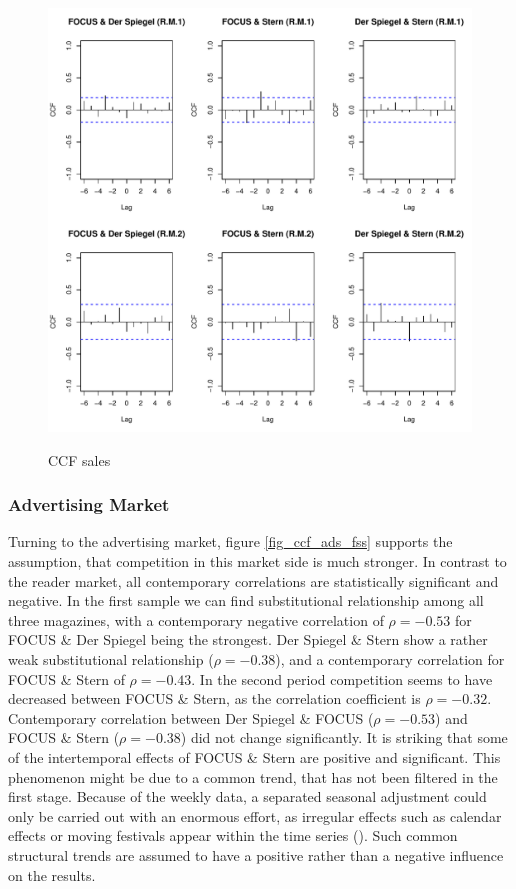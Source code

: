 \documentclass[12pt,a4paper,notitlepage]{article}
\begin{document}
\begin{figure}[H]
\caption{CCF sales}
	\centering
	\includegraphics[scale=0.5]{../figs/ccf_sales_fss}
	\label{fig_ccf_sales_fss}
\end{figure}

\subsubsection{Advertising Market}
Turning to the advertising market, figure \ref{fig_ccf_ads_fss} supports the assumption, that competition in this market side is much stronger. In contrast to the reader market, all contemporary correlations are statistically significant and negative. In the first sample we can find substitutional relationship among all three magazines, with a contemporary negative correlation of $\rho=-0.53$ for FOCUS \& Der Spiegel being the strongest. Der Spiegel \& Stern show a rather weak substitutional relationship ($\rho=-0.38$), and a contemporary correlation for FOCUS \& Stern of $\rho=-0.43$. In the second period competition seems to have decreased between FOCUS \& Stern, as the correlation coefficient is $\rho=-0.32$. Contemporary correlation between Der Spiegel \& FOCUS ($\rho=-0.53$) and FOCUS \& Stern ($\rho=-0.38$) did not change significantly. It is striking that some of the intertemporal effects of FOCUS \& Stern are positive and significant. This phenomenon might be due to a common trend, that has not been filtered in the first stage. Because of the weekly data, a separated seasonal adjustment could only be carried out with an enormous effort, as irregular effects such as calendar effects or moving festivals appear within the time series (\cite{harvey_modeling_1997}). Such common structural trends are assumed to have a positive rather than a negative influence on the results. 
\end{document}
